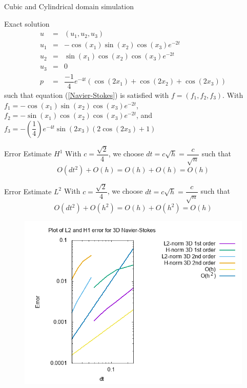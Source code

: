 \documentclass{beamer}
\begin{document}
\begin{frame}{Cubic and Cylindrical domain simulation}
\begin{block}{Exact solution}
		\begin{eqnarray}\nonumber
		u &=& (u_{1},u_{2},u_{3}) \\ \nonumber
		u_{1} &=& -\cos(x_{1}) \sin(x_{2}) \cos(x_3) e^{-2t}\\ \nonumber
		u_{2} &=& \sin(x_{1}) \cos(x_{2}) \cos(x_3) e^{-2t}\\ \nonumber
		u_{3} &=& 0 \\ \nonumber
		p&=& \dfrac{-1}{4} e^{-4t} (\cos(2x_1)+\cos(2x_2)+\cos(2x_3))
		\end{eqnarray}
		such that equation (\ref{Navier-Stokes}) is satisfied with $ f = (f_{1},f_{2},f_3) $. With $ f_{1} = -\cos(x_1) \sin(x_2) \cos(x_3) e^{-2t} $, $ f_{2} = -\sin(x_1) \cos(x_2) \cos(x_3) e^{-2t}  $, and $ f_{3} = -(\dfrac{1}{4})e^{-4t}\sin(2x_3)(2\cos(2x_3)+1)   $
\end{block}
\end{frame}

\begin{frame}
\begin{block}{Error Estimate $ H^{1} $}
	With $ c=\dfrac{\sqrt{2}}{4} $, we choose $ dt = c\sqrt{h} = \dfrac{c}{\sqrt{n}} $ such that
	\[ O(dt^2) + O(h) = O(h) + O(h) = O(h) \]
\end{block}
\begin{block}{Error Estimate $ L^{2} $}
	With $ c=\dfrac{\sqrt{2}}{4} $, we choose $ dt = c\sqrt{h} = \dfrac{c}{\sqrt{n}} $ such that
	\[ O(dt^2) + O(h^2) = O(h) + O(h^2) = O(h) \]
\end{block}
\end{frame}

\begin{frame}
\begin{figure}
	\centering
	\includegraphics[width=1\linewidth]{NS_3D/error_NS_3D}
	\caption{}
	\label{fig:errorns3d}
\end{figure}
\end{frame}
\end{document}
